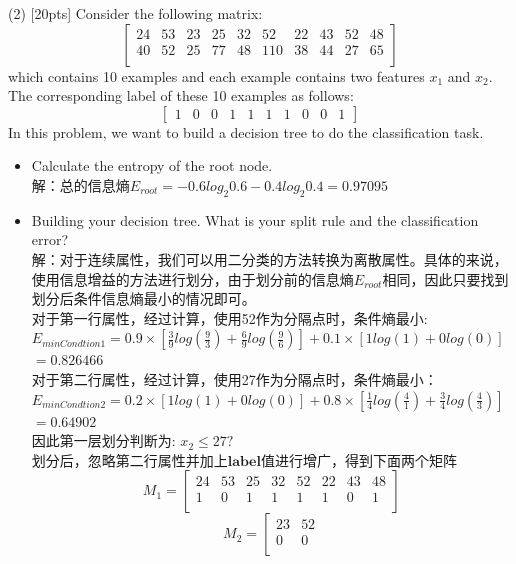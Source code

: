 \documentclass{article}
\begin{document}
	(2) [20pts] Consider the following matrix:
	$$
	\left[
	\begin{matrix}
	24 & 53 & 23 & 25 & 32 & 52 & 22 & 43 & 52 & 48 \\
	40 & 52 & 25 & 77 & 48 & 110 & 38 & 44 & 27 & 65\\
	\end{matrix}
	\right]
	$$
	which contains 10 examples and each example contains two features $x_1$ and $x_2$. The corresponding label of these 10 examples as follows:
	$$
	\left[
	\begin{matrix}
	1 & 0 & 0 &1 & 1 & 1 & 1& 0 & 0 & 1
	\end{matrix}
	\right]
	$$
	In this problem, we want to build a decision tree to do the classification task.
	\begin{itemize}
		\item Calculate the entropy of the root node.
		\\解：总的信息熵$E_{root}=-0.6log_{2}0.6-0.4log_{2}0.4=0.97095$
		\item Building your decision tree. What is your split rule  and the classification error?\\
		解：对于连续属性，我们可以用二分类的方法转换为离散属性。具体的来说，使用信息增益的方法进行划分，由于划分前的信息熵$E_{root}$相同，因此只要找到划分后条件信息熵最小的情况即可。
		\\对于第一行属性，经过计算，使用52作为分隔点时，条件熵最小:\\$E_{minCondtion1}=0.9\times[\frac{3}{9}log(\frac{9}{3})+\frac{6}{9}log(\frac{9}{6})]+0.1\times[1log(1)+0log(0)]$\\$=0.826466$\\
	对于第二行属性，经过计算，使用27作为分隔点时，条件熵最小：\\$E_{minCondtion2}=0.2\times[1log(1)+0log(0)]+0.8\times[\frac{1}{4}log(\frac{4}{1})+\frac{3}{4}log(\frac{4}{3})]$\\$=0.64902$\\
	因此第一层划分判断为: $x_2\leq 27?$\\
	划分后，忽略第二行属性并加上$\bm{label}$值进行增广，得到下面两个矩阵
	$$
	M_1=\left[
	\begin{matrix}
	24 & 53 & 25 & 32 & 52 & 22 & 43 & 48\\
	1 & 0 & 1 & 1 & 1 & 1 & 0 & 1 \\
	\end{matrix}
	\right]
	$$
	$$
	M_2=\left[
	\begin{matrix}
	23 & 52\\
	0 & 0\\

\end{matrix}$$
\end{itemize}
\end{document}
